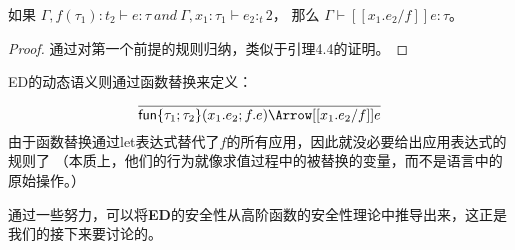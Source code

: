 \begin{lemma}
 如果 $\Gamma,f(\tau_1):t_2 \vdash e:\tau \ and\ \Gamma,x_1:\tau_1 \vdash e_2:_t2$，
 那么 $\Gamma \vdash [[x_1.e_2/f]]e:\tau$。
\end{lemma}
    
\begin{proof}
通过对第一个前提的规则归纳，类似于引理4.4的证明。
\end{proof}

ED的动态语义则通过函数替换来定义：
\begin{equation}
    \dfrac{}
        {\mathsf{fun}\{\tau_1;\tau_2\}(x_1.e_2;f.e) \Arrow [[x_1.e_2/f]]e}
\end{equation}
由于函数替换通过let表达式替代了$f$的所有应用，因此就没必要给出应用表达式的规则了
（本质上，他们的行为就像求值过程中的被替换的变量，而不是语言中的原始操作。）

通过一些努力，可以将\textbf{ED}的安全性从高阶函数的安全性理论中推导出来，这正是我们的接下来要讨论的。